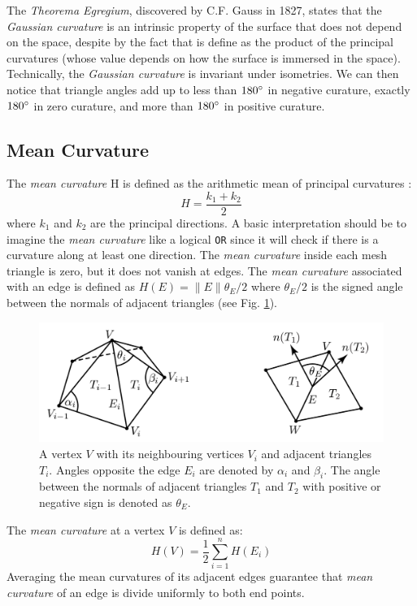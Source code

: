 The \textit{Theorema Egregium}, discovered by C.F. Gauss in 1827, states that the \textit{Gaussian curvature} is an intrinsic property of the surface that does not depend on the space, despite by the fact that is define as the product of the principal curvatures (whose value depends on how the surface is immersed in the space). Technically, the \textit{Gaussian curvature} is invariant under isometries.
We can then notice that triangle angles add up to less than $180 \degree$ in negative curature, exactly $180 \degree$ in zero curature, and more than $180 \degree$ in positive curature.
\cite{geometryprocessing}

\subsection{Mean Curvature}
The \textit{mean curvature} H is defined as the arithmetic mean of principal curvatures : $$H = \frac{k_1 + k_2}{2}$$ where $k_1$ and $k_2$ are the principal directions. A basic interpretation should be to imagine the \textit{mean curvature} like a logical \texttt{OR} since it will check if there is a curvature along at least one direction.\cite{WEBSITE:gaussiancurvaturedirty}
The \textit{mean curvature} inside each mesh triangle is zero, but it does not vanish at edges. The \textit{mean curvature} associated with an edge is defined as $H(E) = \parallel E \parallel {\theta}_E/2$ where ${\theta}_E/2$ is the signed
angle between the normals of adjacent triangles (see Fig. \ref{fig:mean-curvature}).

\begin{figure}[h]
  \centering
\includegraphics[scale=0.4]{images/mean_curvature_paper.png}
\caption{A vertex $V$ with its neighbouring vertices $V_i$ and adjacent triangles $T_i$. Angles opposite the edge $E_i$ are denoted by $\alpha_i$ and $\beta_i$. The
angle between the normals of adjacent triangles $T_1$ and $T_2$ with positive or negative sign is denoted as ${\theta}_E$.\cite{geometryprocessing}}\label{fig:mean-curvature}
\end{figure}
The \textit{mean curvature} at a vertex $V$ is defined as:
$$ H(V) = \frac{1}{2} \sum_{i=1}^n H(E_i)$$ Averaging the mean curvatures of its adjacent edges guarantee that \textit{mean curvature} of an edge is divide uniformly to both end points.
\cite{geometryprocessing}


